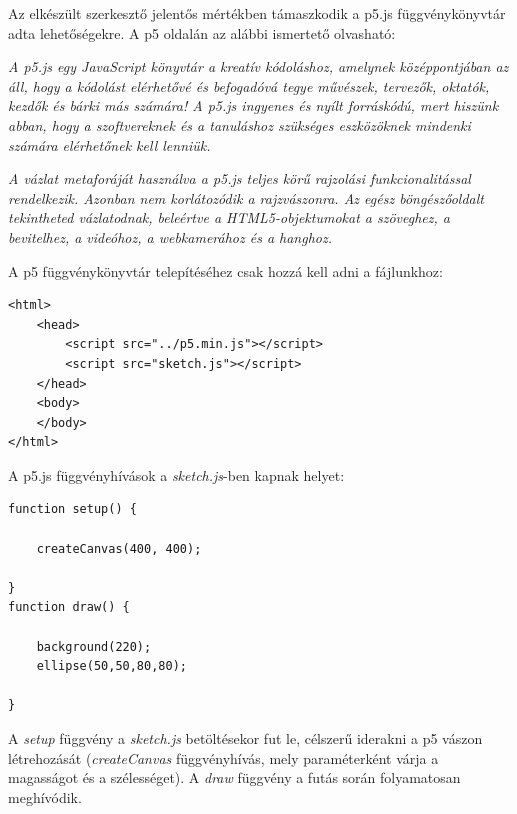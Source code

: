



\noindent
Az elkészült szerkesztő jelentős mértékben támaszkodik a p5.js függvénykönyvtár adta lehetőségekre. A p5 oldalán az alábbi ismertető olvasható:


\noindent
\textit{A p5.js egy JavaScript könyvtár a kreatív kódoláshoz, amelynek középpontjában az áll, hogy a kódolást elérhetővé és befogadóvá tegye művészek, tervezők, oktatók, kezdők és bárki más számára! A p5.js ingyenes és nyílt forráskódú, mert hiszünk abban, hogy a szoftvereknek és a tanuláshoz szükséges eszközöknek mindenki számára elérhetőnek kell lenniük.}

\noindent
\textit{A vázlat metaforáját használva a p5.js teljes körű rajzolási funkcionalitással rendelkezik. Azonban nem korlátozódik a rajzvászonra. Az egész böngészőoldalt tekintheted vázlatodnak, beleértve a HTML5-objektumokat a szöveghez, a bevitelhez, a videóhoz, a webkamerához és a hanghoz. }\cite{p5js}


A p5 függvénykönyvtár telepítéséhez csak hozzá kell adni a fájlunkhoz:

\begin{lstlisting}[style=html]
<html>
	<head>
		<script src="../p5.min.js"></script>
		<script src="sketch.js"></script>
	</head>
	<body>
	</body>
</html>
\end{lstlisting}


A p5.js függvényhívások a \textit{sketch.js}-ben kapnak helyet:

\begin{lstlisting}[style=es6]
function setup() {
	
	createCanvas(400, 400);

}
function draw() {
	
	background(220);
	ellipse(50,50,80,80);

}
\end{lstlisting}

\noindent
A \textit{setup} függvény a \textit{sketch.js} betöltésekor fut le, célszerű iderakni a p5 vászon létrehozását (\textit{createCanvas} függvényhívás, mely paraméterként várja a magasságot és a szélességet). A \textit{draw} függvény a futás során folyamatosan meghívódik.


